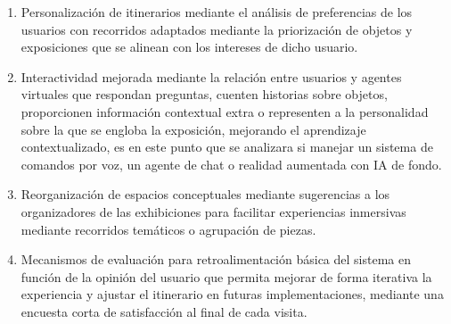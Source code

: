 \documentclass[pdflatex,sn-mathphys-num]{sn-jnl}%
\theoremstyle{thmstyleone}%
\theoremstyle{thmstyletwo}%
\theoremstyle{thmstylethree}%
\begin{document}
\begin{enumerate}
    \item Personalización de itinerarios mediante el análisis de preferencias de los usuarios con recorridos adaptados mediante la priorización de objetos y exposiciones que se alinean con los intereses de dicho usuario.
    \item Interactividad mejorada mediante la relación entre usuarios y agentes virtuales que respondan preguntas, cuenten historias sobre objetos, proporcionen información contextual extra o representen a la personalidad sobre la que se engloba la exposición, mejorando el aprendizaje contextualizado, es en este punto que se analizara si manejar un sistema de comandos por voz, un agente de chat o realidad aumentada con IA de fondo.
    \item Reorganización de espacios conceptuales mediante sugerencias a los organizadores de las exhibiciones para facilitar experiencias inmersivas mediante recorridos temáticos o agrupación de piezas.
    \item Mecanismos de evaluación para retroalimentación básica del sistema en función de la opinión del usuario que permita mejorar de forma iterativa la experiencia y ajustar el itinerario en futuras implementaciones, mediante una encuesta corta de satisfacción al final de cada visita.
\end{enumerate}
\end{document}
